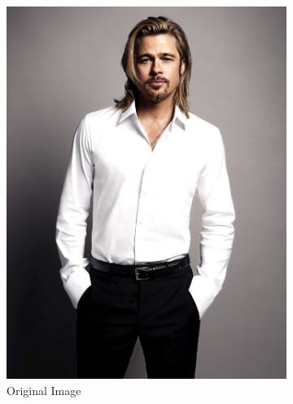 \begin{figure}[H]
  \centering
  \begin{subfigure}[b]{0.3\textwidth}
      \includegraphics[width=\textwidth]{images/2og_image.png}
      \caption{Original Image}
  \end{subfigure}
  \begin{subfigure}[b]{0.3\textwidth}

\end{subfigure}
\end{figure}
